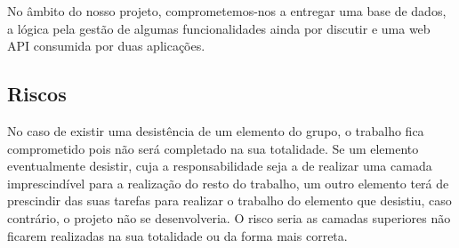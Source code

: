 No âmbito do nosso projeto, comprometemos-nos a entregar uma base de dados, a lógica pela gestão de algumas funcionalidades ainda por discutir e uma web API consumida por duas aplicações.

\subsection*{Riscos}
No caso de existir uma desistência de um elemento do grupo, o trabalho fica comprometido pois não será completado na sua totalidade. Se um elemento eventualmente desistir, cuja a responsabilidade seja a de realizar uma camada imprescindível para a realização do resto do trabalho, um outro elemento terá de prescindir das suas tarefas para realizar o trabalho do elemento que desistiu, caso contrário, o projeto não se desenvolveria. O risco seria as camadas superiores não ficarem realizadas na sua totalidade ou da forma mais correta.